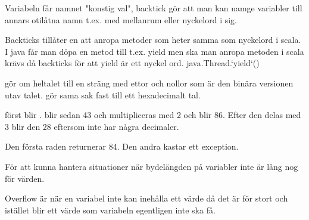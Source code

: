 


\noindent{}


\AdvancedTasks %

\Task %

\Subtask
Variabeln får namnet "konstig val", backtick gör att man kan namge variabler till annars otilåtna namn t.ex. med mellanrum eller nyckelord i sig.
 
\Subtask
Backticks tillåter en att anropa metoder som heter samma som nyckelord i scala. I java får man döpa en metod till t.ex. yield men ska man anropa metoden i scala krävs då backticks för att yield är ett nyckel ord. java.Thread.`yield`()

\Task %
\Subtask
{} gör om heltalet till en sträng med ettor och nollor som är den binära versionen utav talet.  gör sama sak fast till ett hexadecimalt tal.

\Task %

\Task %
 först blir .  blir sedan 43 och multipliceras med 2 och blir 86. Efter den delas med 3 blir den 28 eftersom  inte har några decimaler.

\Task %

\Task %

\Subtask 
Den första raden returnerar 84. Den andra kastar ett exception.

\Subtask
För att kunna hantera situationer när bydelängden på variabler inte är lång nog för värden.

\Subtask
Overflow är när en variabel inte kan inehålla ett värde då det är för stort och istället  blir ett värde som variabeln egentligen inte ska få.

\Task %

\Subtask
{}

\Subtask
{}

\Subtask
{}

\Task %

\Task %







